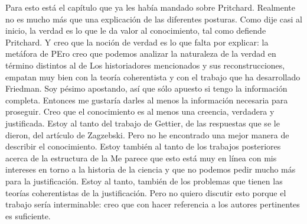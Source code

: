 Para esto está el capítulo que ya les había mandado sobre Pritchard.
Realmente no es mucho más que una explicación de las diferentes posturas.
Como dije casi al inicio, la verdad es lo que le da valor al conocimiento, tal como defiende Pritchard.
Y creo que la noción de verdad es lo que falta por explicar: la metáfora de %
PEro creo que podemos analizar la naturaleza de la verdad en término distintos al de 
Los historiadores mencionados y sus reconstrucciones, empatan muy bien con la teoría coherentista y con el trabajo que ha desarrollado Friedman.
Soy pésimo apostando, así que sólo apuesto si tengo la información completa.
Entonces me gustaría darles al menos la información necesaria para proseguir.
Creo que el conocimiento es al menos una creencia, verdadera y justificada.
Estoy al tanto del trabajo de Gettier, de las respuestas que se le dieron, del artículo de Zagzebski.
Pero no he encontrado una mejor manera de describir el conocimiento.
Estoy también al tanto de los trabajos posteriores acerca de la estructura de la %
Me parece que esto está muy en línea con mis intereses en torno a la historia de la ciencia y que no podemos pedir mucho más para la justificación.
Estoy al tanto, también de los problemas que tienen las teorías coherentistas de la justificación.
Pero no quiero discutir esto porque el trabajo sería interminable: creo que con hacer referencia a los autores pertinentes es suficiente.


